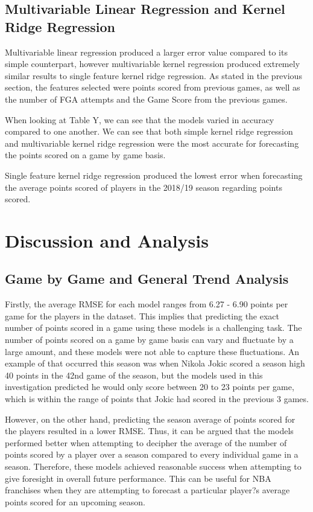 \documentclass[a4paper,11pt,twoside]{article}
\begin{document}
\subsection{Multivariable Linear Regression and Kernel Ridge Regression}
Multivariable  linear regression produced a larger error value compared to its simple counterpart, however multivariable kernel regression produced extremely similar results to single feature kernel ridge regression. As stated in the previous section, the features selected were points scored from previous games, as well as the number of FGA attempts and the Game Score from the previous games.

When looking at Table Y, we can see that the models varied in accuracy compared to one another. We can see that both simple kernel ridge regression and multivariable kernel ridge regression were the most accurate for forecasting the points scored on a game by game basis.

Single feature kernel ridge regression produced the lowest error when forecasting the average points scored of players in the 2018/19 season regarding points scored.


\newpage
\section{Discussion and Analysis}

\subsection{Game by Game and General Trend Analysis}
Firstly, the average RMSE for each model ranges from 6.27 - 6.90 points per game for the players in the dataset. This implies that predicting the exact number of points scored in a game using these models is a challenging task. The number of points scored on a game by game basis can vary and fluctuate by a large amount, and these models were not able to capture these fluctuations. An example of that occurred this season was when Nikola Jokic scored a season high 40 points in the 42nd game of the season, but the models used in this investigation predicted he would only score between 20 to 23 points per game, which is within the range of points that Jokic had scored in the previous 3 games. 

However, on the other hand, predicting the season average of points scored for the players resulted in a lower RMSE. Thus, it can be argued that the models performed better when attempting to decipher the average of the number of points scored by a player over a season compared to every individual game in a season. Therefore, these models achieved reasonable success when attempting to give foresight in overall future performance. This can be useful for NBA franchises when they are attempting to forecast a particular player?s average points scored for an upcoming season.
\end{document}
